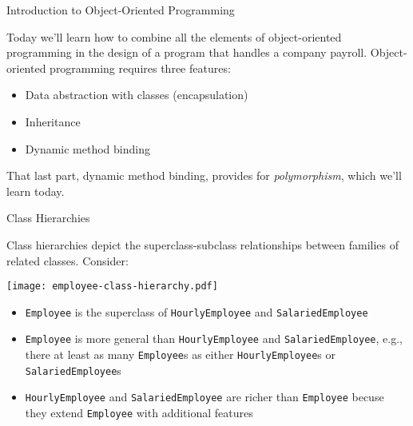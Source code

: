 \documentclass{beamer}
\begin{document}
\begin{frame}
  \titlepage
\end{frame}

\begin{frame}[fragile]{Introduction to Object-Oriented Programming}


Today we'll learn how to combine all the elements of object-oriented programming in the design of a program that handles a company payroll.  Object-oriented programming requires three features:
\begin{itemize}
\item Data abstraction with classes (encapsulation)
\item Inheritance
\item Dynamic method binding
\end{itemize}

That last part, dynamic method binding, provides for {\it polymorphism}, which we'll learn today.

\end{frame}

\begin{frame}[fragile]{Class Hierarchies}

\vspace{-.05in}
Class hierarchies depict the superclass-subclass relationships between families of related classes.  Consider:
\vspace{-.05in}
\begin{center}
\texttt{[image: employee-class-hierarchy.pdf]}
\end{center}
\vspace{-.2in}
\begin{itemize}
\item {\tt Employee} is the superclass of {\tt HourlyEmployee} and {\tt SalariedEmployee}
\item {\tt Employee} is more general than {\tt HourlyEmployee} and {\tt SalariedEmployee}, e.g., there at least as many {\tt Employee}s as either {\tt HourlyEmployee}s or {\tt SalariedEmployee}s
\item {\tt HourlyEmployee} and {\tt SalariedEmployee} are richer than {\tt Employee} becuse they extend {\tt Employee} with additional features
\end{itemize}


\end{frame}
\end{document}
